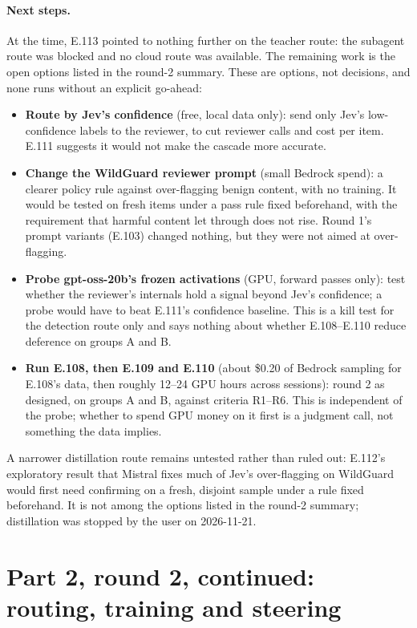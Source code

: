 \documentclass[11pt]{article}
\renewcommand{\_}{\origunderscore\allowbreak}
\begin{document}
\paragraph{Next steps.}
At the time, E.113 pointed to nothing further on the teacher route: the subagent route was blocked and no cloud route was available. The remaining work is the open options listed in the round-2 summary. These are options, not decisions, and none runs without an explicit go-ahead:
\begin{itemize}[leftmargin=*]
  \item \textbf{Route by Jev's confidence} (free, local data only): send only Jev's low-confidence labels to the reviewer, to cut reviewer calls and cost per item. E.111 suggests it would not make the cascade more accurate.
  \item \textbf{Change the WildGuard reviewer prompt} (small Bedrock spend): a clearer policy rule against over-flagging benign content, with no training. It would be tested on fresh items under a pass rule fixed beforehand, with the requirement that harmful content let through does not rise. Round 1's prompt variants (E.103) changed nothing, but they were not aimed at over-flagging.
  \item \textbf{Probe gpt-oss-20b's frozen activations} (GPU, forward passes only): test whether the reviewer's internals hold a signal beyond Jev's confidence; a probe would have to beat E.111's confidence baseline. This is a kill test for the detection route only and says nothing about whether E.108--E.110 reduce deference on groups A and B.
  \item \textbf{Run E.108, then E.109 and E.110} (about \$0.20 of Bedrock sampling for E.108's data, then roughly 12--24 GPU hours across sessions): round 2 as designed, on groups A and B, against criteria R1--R6. This is independent of the probe; whether to spend GPU money on it first is a judgment call, not something the data implies.
\end{itemize}
A narrower distillation route remains untested rather than ruled out: E.112's exploratory result that Mistral fixes much of Jev's over-flagging on WildGuard would first need confirming on a fresh, disjoint sample under a rule fixed beforehand. It is not among the options listed in the round-2 summary; distillation was stopped by the user on 2026-11-21.

\section{Part 2, round 2, continued: routing, training and steering}\label{sec:part2r2b}
\end{document}
